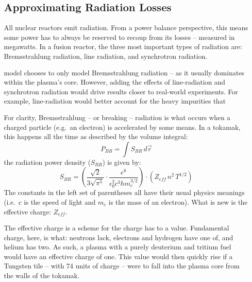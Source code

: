 \subsection{Approximating Radiation Losses}

All nuclear reactors emit radiation. From a power balance perspective, this means some power has to always be reserved to recoup from its losses -- measured in megawatts. In a fusion reactor, the three most important types of radiation are: Bremsstrahlung radiation, line radiation, and synchrotron radiation.

 model chooses to only model Bremsstrahlung radiation -- as it usually dominates within the plasma's core.  However, adding the effects of line-radiation and synchrotron radiation would drive results closer to real-world experiments. For example, line-radiation would better account for the  heavy impurities that 

For clarity, Bremsstrahlung -- or breaking -- radiation is what occurs when a charged particle (e.g.\ an electron) is accelerated by some means. In a tokamak, this happens all the time as   described by the volume integral:
\begin{equation}
	P_{BR} = \int S_{BR} \, d \vec{r}
\end{equation}
 the radiation power density ($S_{BR}$) is given by:
\begin{equation}
	S_{BR} = \left( \frac{\sqrt{2}}{3 \sqrt{\pi^5}} \cdot \frac{e^6}{\epsilon_0^2 c^3 h m_e^{3/2}} \right) \cdot \left( Z_{eff} \, n^2 \, T^{1/2} \right)
\end{equation}
The constants in the left set of parentheses all have their usual physics meanings (i.e.\ c is the speed of light and $m_e$ is the mass of an electron). What is new is the effective charge: $Z_{eff}$.

The effective charge is a scheme for  the charge  has to a  value. Fundamental charge, here, is what: neutrons lack, electrons and hydrogen have one of, and helium has two. As such, a plasma with a purely deuterium and tritium fuel would have an effective charge of one. This value would then quickly rise if a Tungsten tile -- with 74 units of charge -- were to fall into the plasma core from the walls of the tokamak.

